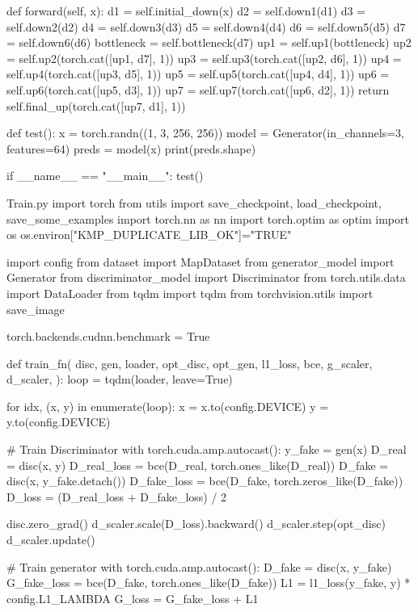     def forward(self, x):
        d1 = self.initial_down(x)
        d2 = self.down1(d1)
        d3 = self.down2(d2)
        d4 = self.down3(d3)
        d5 = self.down4(d4)
        d6 = self.down5(d5)
        d7 = self.down6(d6)
        bottleneck = self.bottleneck(d7)
        up1 = self.up1(bottleneck)
        up2 = self.up2(torch.cat([up1, d7], 1))
        up3 = self.up3(torch.cat([up2, d6], 1))
        up4 = self.up4(torch.cat([up3, d5], 1))
        up5 = self.up5(torch.cat([up4, d4], 1))
        up6 = self.up6(torch.cat([up5, d3], 1))
        up7 = self.up7(torch.cat([up6, d2], 1))
        return self.final_up(torch.cat([up7, d1], 1))


def test():
    x = torch.randn((1, 3, 256, 256))
    model = Generator(in_channels=3, features=64)
    preds = model(x)
    print(preds.shape)


if __name__ == "__main__":
    test()




Train.py
import torch
from utils import save_checkpoint, load_checkpoint, save_some_examples
import torch.nn as nn
import torch.optim as optim
import os
os.environ["KMP_DUPLICATE_LIB_OK"]="TRUE"

import config
from dataset import MapDataset
from generator_model import Generator
from discriminator_model import Discriminator
from torch.utils.data import DataLoader
from tqdm import tqdm
from torchvision.utils import save_image

torch.backends.cudnn.benchmark = True


def train_fn(
    disc, gen, loader, opt_disc, opt_gen, l1_loss, bce, g_scaler, d_scaler,
):
    loop = tqdm(loader, leave=True)

    for idx, (x, y) in enumerate(loop):
        x = x.to(config.DEVICE)
        y = y.to(config.DEVICE)

        # Train Discriminator
        with torch.cuda.amp.autocast():
            y_fake = gen(x)
            D_real = disc(x, y)
            D_real_loss = bce(D_real, torch.ones_like(D_real))
            D_fake = disc(x, y_fake.detach())
            D_fake_loss = bce(D_fake, torch.zeros_like(D_fake))
            D_loss = (D_real_loss + D_fake_loss) / 2

        disc.zero_grad()
        d_scaler.scale(D_loss).backward()
        d_scaler.step(opt_disc)
        d_scaler.update()

        # Train generator
        with torch.cuda.amp.autocast():
            D_fake = disc(x, y_fake)
            G_fake_loss = bce(D_fake, torch.ones_like(D_fake))
            L1 = l1_loss(y_fake, y) * config.L1_LAMBDA
            G_loss = G_fake_loss + L1

